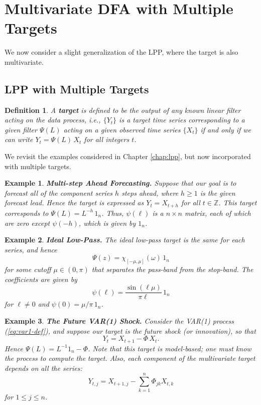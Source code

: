 \documentclass[a4paper]{book}
\def\ZZ{\mathbb Z}
\newtheorem{Definition}{Definition}
\newtheorem{Example}{Example}
\begin{document}
\section{Multivariate DFA with Multiple Targets}
 
  
 We now consider a slight generalization of the LPP, where the target is also multivariate.
 
\subsection{LPP with Multiple Targets} 
 
\begin{Definition} \rm
\label{def:target2}
 A {\bf target} is defined to be the output of any known linear
 filter acting on the data process, i.e.,  $\{Y_t \}$ is a target
 time series corresponding to a given filter $\Psi (L)$ acting on a 
given observed time series
 $\{ X_t \}$ if and only if we can write $ Y_t = \Psi (L) \, X_t$
 for all integers $t$.
\end{Definition}

 We revisit the examples considered in Chapter \ref{chap:lpp}, but
 now incorporated with multiple targets.

\begin{Example} {\bf  Multi-step Ahead Forecasting.}   \rm
\label{exam:multi-step.fore2}
  Suppose that our goal is to forecast all of the component series 
 $h$ steps ahead, where $h \geq 1$ is the given {\em forecast lead}.
  Hence the target is expressed as  $  Y_t = X_{t+h}$
  for all $ t \in \ZZ$.  This target corresponds to
  $\Psi (L) = L^{-h} \, 1_n$.   Thus,   $\psi (\ell)$  is a $n \times n$
  matrix, each of which are zero except $\psi (-h)$,
 which is given by $1_n$.
\end{Example}

\begin{Example} {\bf Ideal Low-Pass.} \rm
\label{exam:ideal-low2}
  The ideal low-pass target is the same for each series, and hence
\[
  \Psi (z) = \chi_{ [ -\mu, \mu ]} (\omega) \,1_n
\]
 for some cutoff $\mu \in (0, \pi)$ that separates the pass-band from
the stop-band.   The coefficients are given by 
\[ 
  \psi (\ell) = \frac{ \sin (\ell \mu) }{ \pi \ell } \, 1_n
\]
 for $\ell \neq 0$ and $\psi (0) = \mu/\pi \, 1_n$.   
\end{Example}

\begin{Example} {\bf The Future VAR(1) Shock.}\rm
\label{exam:var1-shock}
  Consider the VAR(1) process (\ref{eq:var1-def}), and suppose our target is the future shock
  (or innovation), so that
\[
  Y_t = X_{t+1} - \Phi \, X_{t}.
\]
  Hence $\Psi (L) = L^{-1} 1_n - \Phi$.  Note that this target is model-based;
  one must know the process to compute the target.   Also, each component of
  the multivariate target depends on all the series:
\[
  Y_{t,j} = X_{t+1,j} -  \sum_{k=1}^n \Phi_{jk} X_{t,k}
\]
 for $1 \leq j \leq n$.
\end{Example}
\end{document}

